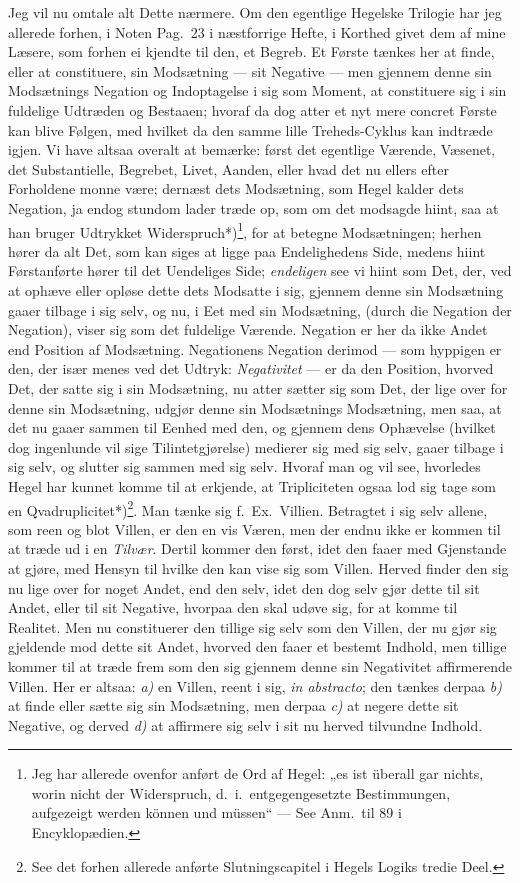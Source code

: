 \documentclass[12pt,a4paper]{book}
\newcommand{\apage}[1]{\marginnote{\footnotesize\textit{[#1]}}}
\begin{document}
Jeg vil nu omtale alt Dette nærmere. Om den egentlige Hegelske Trilogie har jeg
allerede forhen, i Noten Pag.\ 23 i næstforrige Hefte, i Korthed givet dem af
mine Læsere, som forhen ei kjendte til den, et Begreb. Et Første tænkes her at
finde, eller at constituere, sin Modsætning --- sit Negative --- men gjennem
denne sin Modsætnings Negation og Indoptagelse i sig som Moment, at constituere
sig i sin fuldelige Udtræden og Bestaaen; hvoraf da dog atter et nyt mere
concret Første kan blive Følgen, med hvilket da den samme lille Treheds-Cyklus
kan indtræde igjen. Vi have altsaa overalt at bemærke: først det egentlige
Værende, Væsenet, det Substantielle, Begrebet, Livet, Aanden, eller hvad det nu
ellers efter Forholdene monne være; dernæst dets Modsætning, som Hegel kalder
dets Negation, ja endog stundom lader træde op, som om det modsagde hiint, saa
at han bruger Udtrykket Widerspruch*)\footnote{Jeg har allerede ovenfor anført de
Ord af Hegel: „es ist überall gar nichts, worin nicht der Widerspruch, d.\ i.\
entgegengesetzte Bestimmungen, aufgezeigt werden können und müssen“ --- See
Anm.\ til 89 i Encyklopædien.}, for at betegne Modsætningen; herhen hører da
alt Det, som kan siges at ligge paa Endelighedens Side, medens hiint
Førstanførte hører til det Uendeliges Side; \emph{endeligen} see vi hiint som Det,
der, ved at ophæve eller opløse dette dets Modsatte i sig, gjennem denne sin
Modsætning gaaer tilbage i sig selv, og nu, i Eet med sin Modsætning, (durch
die Negation der Negation), viser sig som det fuldelige Værende. Negation er
her da ikke Andet end Position af Modsætning. Negationens Negation derimod ---
som hyppigen er den, der især menes ved det Udtryk: \emph{Negativitet} --- er da den
Position, hvorved Det, der satte sig i sin Modsætning, nu atter sætter sig som
Det, der lige over for denne sin \apage{127} Modsætning, udgjør denne sin Modsætnings
Modsætning, men saa, at det nu gaaer sammen til Eenhed med den, og gjennem dens
Ophævelse (hvilket dog ingenlunde vil sige Tilintetgjørelse) medierer sig med
sig selv, gaaer tilbage i sig selv, og slutter sig sammen med sig selv. Hvoraf
man og vil see, hvorledes Hegel har kunnet komme til at erkjende, at
Tripliciteten ogsaa lod sig tage som en Qvadruplicitet*)\footnote{See det forhen
allerede anførte Slutningscapitel i Hegels Logiks tredie Deel.}. Man tænke sig
f.\ Ex.\ Villien. Betragtet i sig selv allene, som reen og blot Villen, er den
en vis Væren, men der endnu ikke er kommen til at træde ud i en \emph{Tilvær}. Dertil
kommer den først, idet den faaer med Gjenstande at gjøre, med Hensyn til hvilke
den kan vise sig som Villen. Herved finder den sig nu lige over for noget
Andet, end den selv, idet den dog selv gjør dette til sit Andet, eller til sit
Negative, hvorpaa den skal udøve sig, for at komme til Realitet. Men nu
constituerer den tillige sig selv som den Villen, der nu gjør sig gjeldende mod
dette sit Andet, hvorved den faaer et bestemt Indhold, men tillige kommer til
at træde frem som den sig gjennem denne sin Negativitet affirmerende Villen.
Her er altsaa: \textit{a)} en Villen, reent i sig, \textit{in abstracto}; den tænkes
derpaa \textit{b)} at finde eller sætte sig sin Modsætning, men derpaa \textit{c)} at negere
dette sit Negative, og derved \textit{d)} at affirmere sig selv i sit nu herved
tilvundne Indhold.
\end{document}

